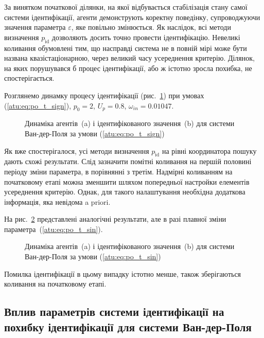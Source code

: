 За винятком початкової ділянки, на якої відбувається
стабілізація стану самої системи ідентифікації, агенти
демонструють коректну поведінку, супроводжуючи значення параметра
$\varepsilon$, яке повільно змінюється.
Як наслідок, всі методи визначення
$p_\mathrm{id}$ дозволяють досить точно провести
ідентифікацію. Невеликі коливання обумовлені тим, що насправді
система не в повній мірі може бути названа квазістаціонарною,
через великий часу усереднення критерію. Ділянок, на яких
порушувався б процес ідентифікації, або ж істотно зросла
похибка, не спостерігається.

Розглянемо динамку процесу ідентифікації (рис.~\ref{atu:f:vdp_id1_sign})
при умовах (\ref{atu:eq:po_t_sign}),
$p_0 = 2$,
$U_p = 0.8$,
$\omega_{in} = 0.01047$.

\begin{figure}[ht!]
  \caption{Динаміка агентів~(a) і ідентифікованого значення~(b) для системи Ван-дер-Поля за умови (\ref{atu:eq:po_t_sign})}
\label{atu:f:vdp_id1_sign}
\end{figure}

Як вже спостерігалося, усі методи визначення
$p_\mathrm{id}$ на рівні координатора пошуку дають схожі
результати. Слід зазначити помітні коливання на першій половині
періоду зміни параметра, в порівнянні з третім. Надмірні
коливанням на початковому етапі можна зменшити шляхом
попередньої настройки елементів усереднення критерію. Однак,
для такого налаштування необхідна додаткова інформація, яка
невідома a priori.

На рис.~\ref{atu:f:vdp_id1_sin} представлені аналогічні результати, але
в разі плавної зміни параметра~(\ref{atu:eq:po_t_sin}).

\begin{figure}[ht!]
  \caption{Динаміка агентів~(a) і ідентифікованого значення~(b) для системи Ван-дер-Поля за умови (\ref{atu:eq:po_t_sin})}
\label{atu:f:vdp_id1_sin}
\end{figure}

Помилка ідентифікації в цьому випадку істотно менше, також
зберігаються коливання на початковому етапі.



\subsection{Вплив параметрів системи ідентифікації на похибку ідентифікації для системи Ван-дер-Поля} %

